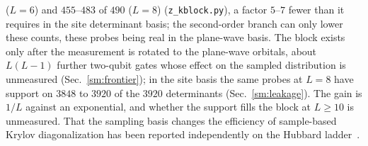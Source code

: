 ($L=6$) and $455$--$483$ of $490$ ($L=8$) (\texttt{z\_kblock.py}), a factor $5$--$7$ fewer than it requires in
the site determinant basis; the second-order branch can only lower these counts, these probes being real in
the plane-wave basis. The block exists only after the measurement is rotated to the plane-wave
orbitals, about $L(L-1)$ further two-qubit gates whose effect on the sampled distribution is unmeasured
(Sec.~\ref{sm:frontier}); in the site basis the same probes at $L=8$ have support on $3848$ to $3920$ of
the $3920$ determinants (Sec.~\ref{sm:leakage}). The gain is $1/L$ against an exponential, and whether
the support fills the block at $L\ge10$ is unmeasured. That the sampling basis changes the efficiency
of sample-based Krylov diagonalization has been reported independently on the Hubbard
ladder~\cite{leicester2026}.

